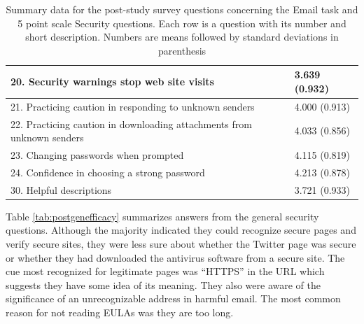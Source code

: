 \begin{table}[ht]
\begin{tabular}{|ll|}
\hline
20. Security warnings stop web site visits   & 3.639 (0.932) \\ \hline
21. Practicing caution in responding to unknown senders                & 4.000 (0.913) \\ \hline
22. Practicing caution in downloading attachments from unknown senders & 4.033 (0.856) \\ \hline
23. Changing passwords when prompted         & 4.115 (0.819) \\ \hline
24. Confidence in choosing a strong password & 4.213 (0.878) \\ \hline
30. Helpful descriptions                     & 3.721 (0.933) \\ \hline
\end{tabular}
\caption{Summary data for the post-study survey questions concerning the Email task and 5 point
scale Security questions. Each row is a question with its number and short description. Numbers
are means followed by standard deviations in parenthesis}
\label{tab:postemailefficacy}
\end{table}

Table \ref{tab:postgenefficacy}
 summarizes answers from the general security questions. Although the majority indicated they could recognize secure pages and verify secure sites, they were less sure about whether the Twitter page was secure or whether they had downloaded the antivirus software from a secure site. The cue most recognized for legitimate pages was ``HTTPS'' in the URL which suggests they have some idea of its meaning. They also were aware of the significance of an unrecognizable address in harmful email. The most common reason for not reading EULAs was they are too long.


